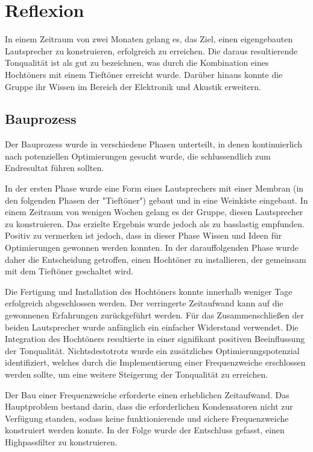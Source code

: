 \documentclass[a4paper,11pt]{report}
\begin{document}
\chapter{Reflexion}

In einem Zeitraum von zwei Monaten gelang es, das Ziel, einen eigengebauten Lautsprecher zu konstruieren, erfolgreich zu erreichen. Die daraus resultierende Tonqualität ist als gut zu bezeichnen, was durch die Kombination eines Hochtöners mit einem Tieftöner erreicht wurde. Darüber hinaus konnte die Gruppe ihr Wissen im Bereich der Elektronik und Akustik erweitern. 

\section{Bauprozess}
Der Bauprozess wurde in verschiedene Phasen unterteilt, in denen kontinuierlich nach potenziellen Optimierungen gesucht wurde, die schlussendlich zum Endresultat führen sollten.

In der ersten Phase wurde eine Form eines Lautsprechers mit einer Membran (in den folgenden Phasen der "Tieftöner") gebaut und in eine Weinkiste eingebaut. In einem Zeitraum von wenigen Wochen gelang es der Gruppe, diesen Lautsprecher zu konstruieren. Das erzielte Ergebnis wurde jedoch als zu basslastig empfunden. Positiv zu vermerken ist jedoch, dass in dieser Phase Wissen und Ideen für Optimierungen gewonnen werden konnten. In der darauffolgenden Phase wurde daher die Entscheidung getroffen, einen Hochtöner zu installieren, der gemeinsam mit dem Tieftöner geschaltet wird. 

Die Fertigung und Installation des Hochtöners konnte innerhalb weniger Tage erfolgreich abgeschlossen werden. Der verringerte Zeitaufwand kann auf die gewonnenen Erfahrungen zurückgeführt werden. Für das Zusammenschließen der beiden Lautsprecher wurde anfänglich ein einfacher Widerstand verwendet. Die Integration des Hochtöners resultierte in einer signifikant positiven Beeinflussung der Tonqualität. Nichtsdestotrotz wurde ein zusätzliches Optimierungspotenzial identifiziert, welches durch die Implementierung einer Frequenzweiche erschlossen werden sollte, um eine weitere Steigerung der Tonqualität zu erreichen.

Der Bau einer Frequenzweiche erforderte einen erheblichen Zeitaufwand. Das Hauptproblem bestand darin, dass die erforderlichen Kondensatoren nicht zur Verfügung standen, sodass keine funktionierende und sichere Frequenzweiche konstruiert werden konnte. In der Folge wurde der Entschluss gefasst, einen Highpassfilter zu konstruieren.
\end{document}

